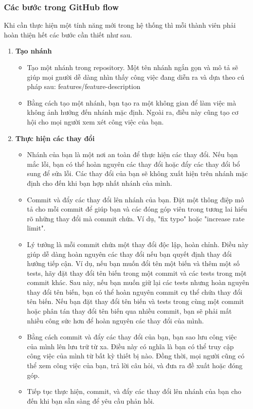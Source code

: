 \subsubsection{Các bước trong GitHub flow}
Khi cần thực hiện một tính năng mới trong hệ thống thì mỗi thành viên phải hoàn thiện hết các bước cần thiết như sau.
\begin{enumerate}
    \item \textbf{Tạo nhánh}
    \begin{itemize}
        \item Tạo một nhánh trong repository. Một tên nhánh ngắn gọn và mô tả sẽ giúp mọi gnười dễ dàng nhìn thấy công việc đang diễn ra và dựa theo cú pháp sau: features/{feature-description} 
        \item Bằng cách tạo một nhánh, bạn tạo ra một không gian để làm việc mà không ảnh hưởng đến nhánh mặc định. Ngoài ra, điều này cũng tạo cơ hội cho mọi người xem xét công việc của bạn.
    \end{itemize}

    \item \textbf{Thực hiện các thay đổi}
    \begin{itemize}
        \item Nhánh của bạn là một nơi an toàn để thực hiện các thay đổi. Nếu bạn mắc lỗi, bạn có thể hoàn nguyên các thay đổi hoặc đẩy các thay đổi bổ sung để sửa lỗi. Các thay đổi của bạn sẽ không xuất hiện trên nhánh mặc định cho đến khi bạn hợp nhất nhánh của mình.
        \item Commit và đẩy các thay đổi lên nhánh của bạn. Đặt một thông điệp mô tả cho mỗi commit để giúp bạn và các đóng góp viên trong tương lai hiểu rõ những thay đổi mà commit chứa. Ví dụ, "fix typo" hoặc "increase rate limit". 
        \item Lý tưởng là mỗi commit chứa một thay đổi độc lập, hoàn chỉnh. Điều này giúp dễ dàng hoàn nguyên các thay đổi nếu bạn quyết định thay đổi hướng tiếp cận. Ví dụ, nếu bạn muốn đổi tên một biến và thêm một số tests, hãy đặt thay đổi tên biến trong một commit và các tests trong một commit khác. Sau này, nếu bạn muốn giữ lại các tests nhưng hoàn nguyên thay đổi tên biến, bạn có thể hoàn nguyên commit cụ thể chứa thay đổi tên biến. Nếu bạn đặt thay đổi tên biến và tests trong cùng một commit hoặc phân tán thay đổi tên biến qua nhiều commit, bạn sẽ phải mất nhiều công sức hơn để hoàn nguyên các thay đổi của mình.
        \item Bằng cách commit và đẩy các thay đổi của bạn, bạn sao lưu công việc của mình lên lưu trữ từ xa. Điều này có nghĩa là bạn có thể truy cập công việc của mình từ bất kỳ thiết bị nào. Đồng thời, mọi người cũng có thể xem công việc của bạn, trả lời câu hỏi, và đưa ra đề xuất hoặc đóng góp.
        \item Tiếp tục thực hiện, commit, và đẩy các thay đổi lên nhánh của bạn cho đến khi bạn sẵn sàng để yêu cầu phản hồi.
    \end{itemize}
    


\end{enumerate}

